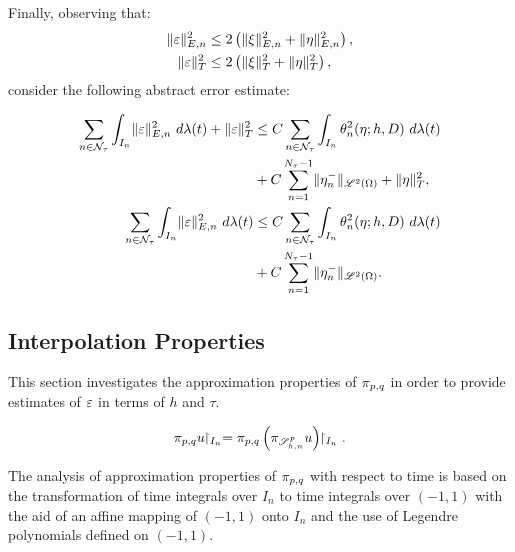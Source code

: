 Finally, observing that:
\begin{align}
    \lVert \varepsilon \rVert_{E, n}^2 &\leq 2 \left( \lVert \xi \rVert_{E, n}^2 + \lVert \eta \rVert_{E, n}^2 \right), \\
    \lVert \varepsilon \rVert_T^2 &\leq 2 \left( \lVert \xi \rVert_T^2 + \lVert \eta \rVert_T^2 \right),
\end{align}
consider the following abstract error estimate:
\begin{lemma}
    \begin{align}
        \sum_{n \in \mathcal{N}_{\tau}} \int_{I_n} \lVert \varepsilon \rVert_{E, n}^2 ~ d \lambda(t) + \lVert \varepsilon \rVert_T^2 &\leq C \sum_{n \in \mathcal{N}_{\tau}} \int_{I_n} \theta_n^2(\eta; h, D) ~ d \lambda(t) \\
        &+ C \sum_{n = 1}^{N_{\tau} - 1} \lVert \eta_n^- \rVert_{\mathscr{L}^{2}(\Omega)} + \lVert \eta \rVert_T^2, \notag \\ 
        \sum_{n \in \mathcal{N}_{\tau}} \int_{I_n} \lVert \varepsilon \rVert_{E, n}^2 ~ d \lambda(t) &\leq C \sum_{n \in \mathcal{N}_{\tau}} \int_{I_n} \theta_n^2(\eta; h, D) ~ d \lambda(t) \\
        &+ C \sum_{n = 1}^{N_{\tau} - 1} \lVert \eta_n^- \rVert_{\mathscr{L}^{2}(\Omega)}. \notag
    \end{align}
\end{lemma}

\newpage
\subsection{Interpolation Properties}

This section investigates the approximation properties of $\pi_{p, q}$ in order to provide estimates of $\varepsilon$ in terms of $h$ and $\tau$.

\begin{lemma}
    \begin{align}
        \pi_{p, q} u \!\!\restriction_{I_n} = \pi_{p, q} \left( \pi_{\mathscr{S}^p_{h, n}} u \right) \!\!\restriction_{I_n}.
    \end{align}
\end{lemma}

The analysis of approximation properties of $\pi_{p, q}$ with respect to time is based on the transformation of time integrals over $I_n$ to time integrals over $\left( -1, 1 \right)$ with the aid of an affine mapping of $\left( -1, 1 \right)$ onto $I_n$ and the use of Legendre polynomials defined on $\left( -1, 1 \right)$.

